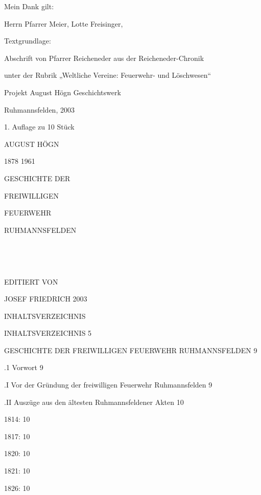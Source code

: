 Mein Dank gilt:

Herrn Pfarrer Meier, Lotte Freisinger,



Textgrundlage:

Abschrift von Pfarrer Reicheneder aus der Reicheneder-Chronik

unter der Rubrik „Weltliche Vereine: Feuerwehr- und Löschwesen“



Projekt August Högn Geschichtswerk

Ruhmannsfelden, 2003

1. Auflage zu 10 Stück



AUGUST HÖGN

1878 1961





GESCHICHTE DER

FREIWILLIGEN

FEUERWEHR

RUHMANNSFELDEN



























EDITIERT VON

JOSEF FRIEDRICH 2003





INHALTSVERZEICHNIS

INHALTSVERZEICHNIS  5

GESCHICHTE DER FREIWILLIGEN FEUERWEHR RUHMANNSFELDEN    9

.1 Vorwort  9

.I Vor der Gründung der freiwilligen Feuerwehr Ruhmannsfelden   9

.II Auszüge aus den ältesten Ruhmannsfeldener Akten 10

1814:   10

1817:   10

1820:   10

1821:   10

1826:   10


